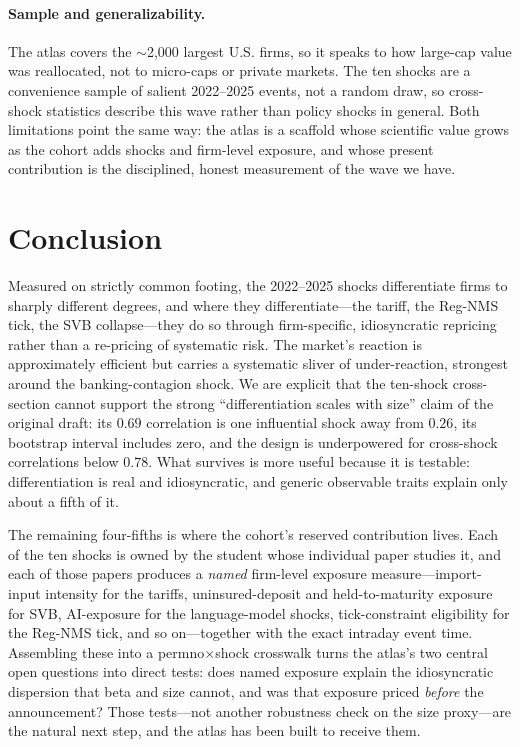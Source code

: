 \documentclass[12pt]{article}
\begin{document}
\paragraph{Sample and generalizability.} The atlas covers the $\sim$2{,}000 largest U.S. firms, so it
speaks to how large-cap value was reallocated, not to micro-caps or private markets. The ten shocks
are a convenience sample of salient 2022--2025 events, not a random draw, so cross-shock statistics
describe this wave rather than policy shocks in general. Both limitations point the same way: the
atlas is a scaffold whose scientific value grows as the cohort adds shocks and firm-level exposure,
and whose present contribution is the disciplined, honest measurement of the wave we have.

\section{Conclusion}\label{sec:concl}
Measured on strictly common footing, the 2022--2025 shocks differentiate firms to sharply different
degrees, and where they differentiate---the tariff, the Reg-NMS tick, the SVB collapse---they do so
through firm-specific, idiosyncratic repricing rather than a re-pricing of systematic risk. The
market's reaction is approximately efficient but carries a systematic sliver of under-reaction,
strongest around the banking-contagion shock. We are explicit that the ten-shock cross-section
cannot support the strong ``differentiation scales with size'' claim of the original draft: its
$0.69$ correlation is one influential shock away from $0.26$, its bootstrap interval includes zero,
and the design is underpowered for cross-shock correlations below $0.78$. What survives is more
useful because it is testable: differentiation is real and idiosyncratic, and generic observable
traits explain only about a fifth of it.

The remaining four-fifths is where the cohort's reserved contribution lives. Each of the ten shocks
is owned by the student whose individual paper studies it, and each of those papers produces a
\emph{named} firm-level exposure measure---import-input intensity for the tariffs, uninsured-deposit
and held-to-maturity exposure for SVB, AI-exposure for the language-model shocks, tick-constraint
eligibility for the Reg-NMS tick, and so on---together with the exact intraday event time. Assembling
these into a permno$\times$shock crosswalk turns the atlas's two central open questions into direct
tests: does named exposure explain the idiosyncratic dispersion that beta and size cannot, and was
that exposure priced \emph{before} the announcement? Those tests---not another robustness check on
the size proxy---are the natural next step, and the atlas has been built to receive them.
\end{document}
